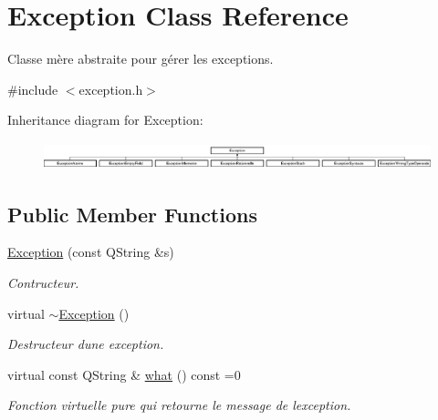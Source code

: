 \hypertarget{class_exception}{}\section{Exception Class Reference}
\label{class_exception}


Classe mère abstraite pour gérer les exceptions.  




{\ttfamily \#include $<$exception.\+h$>$}

Inheritance diagram for Exception\+:\begin{figure}[H]
\begin{center}
\leavevmode
\includegraphics[height=0.812183cm]{class_exception}
\end{center}
\end{figure}
\subsection*{Public Member Functions}
\begin{DoxyCompactItemize}
\item 
\hyperlink{class_exception_a2f8585e6926cd25578104624cecab5c0}{Exception} (const Q\+String \&s)
\begin{DoxyCompactList}\small\item\em Contructeur. \end{DoxyCompactList}\item 
virtual \hyperlink{class_exception_ad1ba411de295ef2eeb02ba26284a829a}{$\sim$\+Exception} ()\hypertarget{class_exception_ad1ba411de295ef2eeb02ba26284a829a}{}\label{class_exception_ad1ba411de295ef2eeb02ba26284a829a}

\begin{DoxyCompactList}\small\item\em Destructeur d\textquotesingle{}une exception. \end{DoxyCompactList}\item 
virtual const Q\+String \& \hyperlink{class_exception_a73ce9dfab1e48800f8818978d014c106}{what} () const  =0
\begin{DoxyCompactList}\small\item\em Fonction virtuelle pure qui retourne le message de l\textquotesingle{}exception. \end{DoxyCompactList}\end{DoxyCompactItemize}
